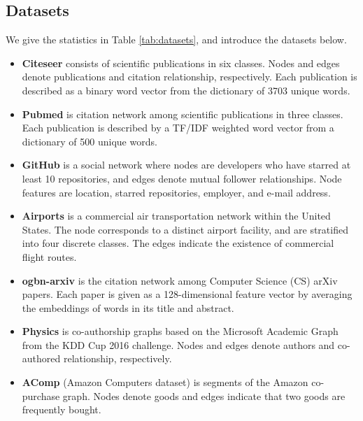 \subsection{Datasets}
We give the statistics in Table \ref{tab:datasets}, and introduce the datasets below.
\begin{itemize}
    \item  \textbf{Citeseer} \cite{citeseerandpubmed} consists of scientific publications in six classes. Nodes and edges denote publications and citation relationship, respectively. Each publication is described as a binary word vector from the dictionary of 3703 unique words.
    \item \textbf{Pubmed} \cite{citeseerandpubmed} is citation network among scientific publications in three classes. Each publication  is described by a TF/IDF weighted word vector from a dictionary  of 500 unique words.
    \item \textbf{GitHub} \cite{github} is a social network where nodes are developers who have starred at least 10 repositories, and edges denote mutual follower relationships. Node features are location, starred repositories, employer, and e-mail address.
    \item \textbf{Airports} \cite{kdd17struc2vec} is a  commercial air transportation network within the United States. The node corresponds to a distinct airport facility, and are stratified into four discrete classes. The edges indicate the existence of commercial flight routes.
    \item  \textbf{ogbn-arxiv} \cite{nips2020arxiv} is the citation network among Computer Science (CS) arXiv papers. Each paper is given as a 128-dimensional feature vector by averaging the embeddings of words in its title and abstract. 
    \item \textbf{Physics} \cite{physics_computers} is co-authorship graphs based on the Microsoft Academic Graph from the KDD Cup 2016 challenge. Nodes and edges denote authors and co-authored relationship, respectively.
    \item \textbf{AComp} (Amazon Computers dataset) \cite{physics_computers} is segments of the Amazon co-purchase graph. Nodes denote goods and edges indicate that two goods are frequently bought.
\end{itemize}


